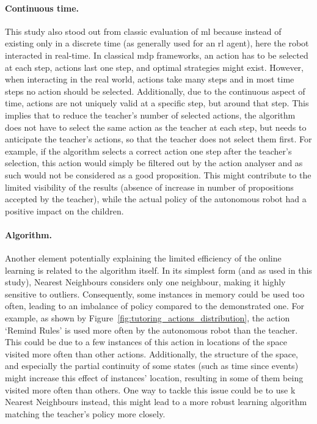 
\paragraph{Continuous time.}

This study also stood out from classic evaluation of \gls{ml} because instead of existing only in a discrete time (as generally used for an \gls{rl} agent), here the robot interacted in real-time. In classical \gls{mdp} frameworks, an action has to be selected at each step, actions last one step, and optimal strategies might exist. However, when interacting in the real world, actions take many steps and in most time steps no action should be selected. Additionally, due to the continuous aspect of time, actions are not uniquely valid at a specific step, but around that step. This implies that to reduce the teacher's number of selected actions, the algorithm does not have to select the same action as the teacher at each step, but needs to anticipate the teacher's actions, so that the teacher does not select them first. For example, if the algorithm selects a correct action one step after the teacher's selection, this action would simply be filtered out by the action analyser and as such would not be considered as a good proposition. This might contribute to the limited visibility of the results (absence of increase in number of propositions accepted by the teacher), while the actual policy of the autonomous robot had a positive impact on the children.


\paragraph{Algorithm.}

Another element potentially explaining the limited efficiency of the online learning is related to the algorithm itself. In its simplest form (and as used in this study), Nearest Neighbours considers only one neighbour, making it highly sensitive to outliers. Consequently, some instances in memory could be used too often, leading to an imbalance of policy compared to the demonstrated one. For example, as shown by Figure~\ref{fig:tutoring_actions_distribution}, the action `Remind Rules' is used more often by the autonomous robot than the teacher. This could be due to a few instances of this action in locations of the space visited more often than other actions. Additionally, the structure of the space, and especially the partial continuity of some states (such as time since events) might increase this effect of instances' location, resulting in some of them being visited more often than others. One way to tackle this issue could be to use k Nearest Neighbours instead, this might lead to a more robust learning algorithm matching the teacher's policy more closely.

